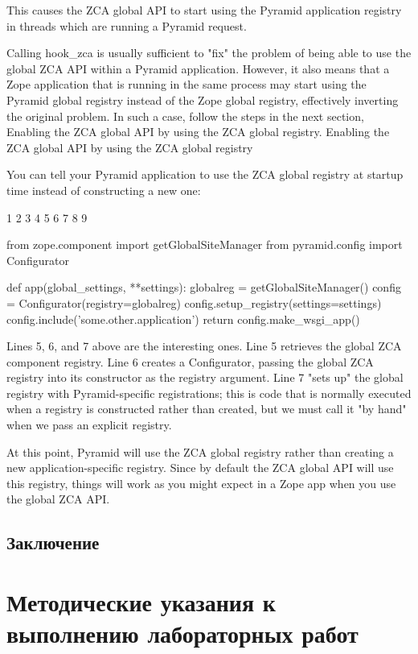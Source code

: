 \documentclass[a4paper,openany,twoside,final]{book}
\begin{document}
This causes the ZCA global API to start using the Pyramid application registry in threads which are running a Pyramid request.

Calling hook_zca is usually sufficient to "fix" the problem of being able to use the global ZCA API within a Pyramid application. However, it also means that a Zope application that is running in the same process may start using the Pyramid global registry instead of the Zope global registry, effectively inverting the original problem. In such a case, follow the steps in the next section, Enabling the ZCA global API by using the ZCA global registry.
Enabling the ZCA global API by using the ZCA global registry

You can tell your Pyramid application to use the ZCA global registry at startup time instead of constructing a new one:

1
2
3
4
5
6
7
8
9



from zope.component import getGlobalSiteManager
from pyramid.config import Configurator

def app(global_settings, **settings):
    globalreg = getGlobalSiteManager()
    config = Configurator(registry=globalreg)
    config.setup_registry(settings=settings)
    config.include('some.other.application')
    return config.make_wsgi_app()

Lines 5, 6, and 7 above are the interesting ones. Line 5 retrieves the global ZCA component registry. Line 6 creates a Configurator, passing the global ZCA registry into its constructor as the registry argument. Line 7 "sets up" the global registry with Pyramid-specific registrations; this is code that is normally executed when a registry is constructed rather than created, but we must call it "by hand" when we pass an explicit registry.

At this point, Pyramid will use the ZCA global registry rather than creating a new application-specific registry. Since by default the ZCA global API will use this registry, things will work as you might expect in a Zope app when you use the global ZCA API.


\newpage{}
\section{Заключение%
  \label{id53}%
}

\clearpage
\chapter{Методические указания к выполнению лабораторных работ}
\label{cha:labs}
\end{document}

